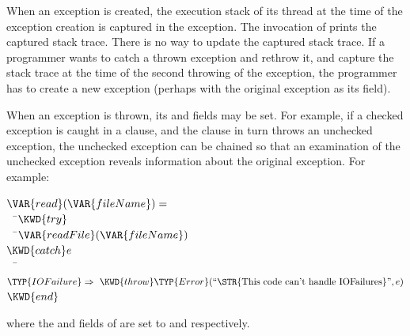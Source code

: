 When an exception is created, the execution stack of its thread at the time
of the exception creation is captured in the exception.  The invocation of
 prints the captured stack trace.
There is no way to update the captured stack trace.
If a programmer wants to catch a thrown exception and rethrow it, and
capture the stack trace at the time of the second throwing of the
exception, the programmer has to create a new exception (perhaps with the
original exception as its  field).

When an exception is thrown, its  and  fields may
be set.
For example, if a checked exception is caught in a  clause, and
the  clause in turn throws an unchecked exception, the unchecked
exception can be chained so that an examination of the unchecked exception
reveals information about the original exception.  For example:
\begin{Fortress}
\(\VAR{read}(\VAR{fileName}) = \)\\
{\tt~~}\pushtabs\=\+\(  \KWD{try}\)\\
{\tt~~}\pushtabs\=\+\(    \VAR{readFile}(\VAR{fileName})\)\-\\\poptabs
\(  \KWD{catch} e\)\\
{\tt~~}\pushtabs\=\+\(    \TYP{IOFailure} \Rightarrow\ \KWD{throw} \TYP{Error}(\hbox{\rm``\STR{This~code~can't~handle~IOFailures}''}, e)\)\-\\\poptabs
\(  \KWD{end}\)\-\\\poptabs
\end{Fortress}
where the  and  fields of  are set to
 and
 respectively.


